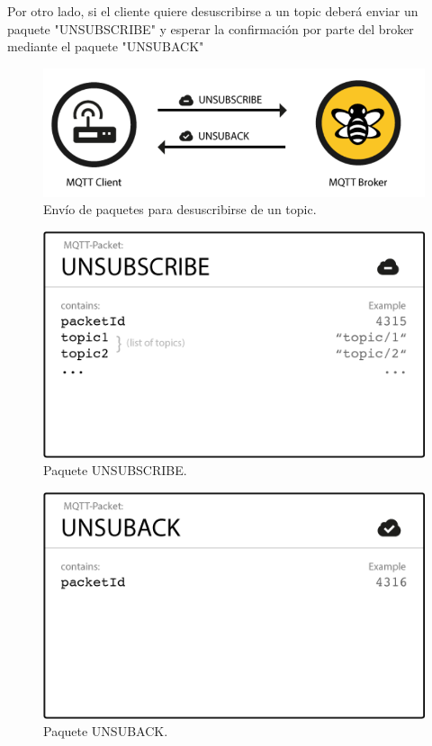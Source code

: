 \documentclass[12pt, twoside]{book}
\begin{document}
Por otro lado, si el cliente quiere desuscribirse a un topic deberá enviar un paquete "UNSUBSCRIBE" y esperar la confirmación por parte del broker mediante el paquete "UNSUBACK"
\begin{figure}[H]
\centering
\includegraphics[scale=0.5]{images/flujo_desuscribir.png}
\caption{Envío de paquetes para desuscribirse de un topic.\cite{hive}}\label{L406}
\end{figure}
\begin{figure}[H]
\centering
\includegraphics[scale=0.3]{images/unsubscribe_packet.png}
\caption{Paquete UNSUBSCRIBE.\cite{hive}}\label{L407}
\end{figure}
\begin{figure}[H]
\centering
\includegraphics[scale=0.3]{images/unsuback_packet.png}
\caption{Paquete UNSUBACK.\cite{hive}}\label{L408}
\end{figure}
\end{document}

